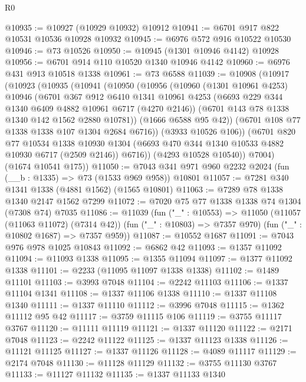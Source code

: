 \begin{lexlean}{R0}
\begin{coremodule}
@10935 := @10927 (@10929 @10932) @10912
@10941 := @6701 @917 @822 @10531 @10536 @10928 @10932
@10945 := @6976 @572 @916 @10522 @10530
@10946 := @73 @10526
@10950 := @10945 (@1301 @10946 @4142) @10928
@10956 := @6701 @914 @110 @10520 @1340 @10946 @4142
@10960 := @6976 @431 @913 @10518 @1338
@10961 := @73 @6588
@11039 := @10908
    (@10917
      (@10923
        (@10935
          (@10941
            (@10950
              (@10956
                (@10960
                  (@1301 @10961 @4253)
                  @10946
                  (@6701
                    @367
                    @912
                    @6410
                    @1341
                    @10961
                    @4253
                    (@6693 @229 @344 @1340 @6409 @4882 @10961 @6717 (@4270 @2146))
                    (@6701 @143 @78 @1338 @1340 @142 @1562 @2880 @10781))
                  (@1666 @6588 @95 @42))
                (@6701 @108 @77 @1338 @1338 @107 @1304 @2684 @6716))
              (@3933 @10526 @106))
            (@6701
              @820
              @77
              @10534
              @1338
              @10930
              @1304
              (@6693 @470 @344 @1340 @10533 @4882 @10930 @6717 (@2509 @2146))
              @6716))
          (@4293 @10528 @10540))
        @7004)
      (@1674 @10541 @175))
@11050 := @7043 @341 @971 @960 @2232 @2024 (fun (__b : @1335) => @73 (@1533 @969 @958)) @10801
@11057 := @7281 @340 @1341 @1338 (@4881 @1562) (@1565 @10801)
@11063 := @7289 @78 @1338 @1340 @2147 @1562 @7299
@11072 := @7020 @75 @77 @1338 @1338 @74 @1304 (@7308 @74) @7035
@11086 := @11039
    (fun ("_" : @10553) =>
    @11050
      (@11057 (@11063 @11072) (@7314 @42))
      (fun ("_" : @10803) => @7357 @970)
      (fun ("_" : @10802 @1687) => @7357 @959))
@11087 := @10552 @1687
@11091 := @7043 @976 @978 @1025 @10843
@11092 := @6862 @42
@11093 := @1357 @11092
@11094 := @11093 @1338
@11095 := @1355 @11094
@11097 := @1377 @11092 @1338
@11101 := @2233 (@11095 @11097 @1338 @1338)
@11102 := @1489 @11101
@11103 := @3993 @7048
@11104 := @2242 @11103
@11106 := @1337 @11104 @1341
@11108 := @1337 @11106 @1338
@11110 := @1337 @11108 @1340
@11111 := @1337 @11110
@11112 := @3996 @7048
@11115 := @1362 @11112 @95 @42
@11117 := @3759 @11115 @106
@11119 := @3755 @11117 @3767
@11120 := @11111 @11119
@11121 := @1337 @11120
@11122 := @2171 @7048
@11123 := @2242 @11122
@11125 := @1337 @11123 @1338
@11126 := @11121 @11125
@11127 := @1337 @11126
@11128 := @4089 @11117
@11129 := @2174 @7048
@11130 := @11128 @11129
@11132 := @3755 @11130 @3767
@11133 := @11127 @11132
@11135 := @1337 @11133 @1340

\end{coremodule}
\end{lexlean}
